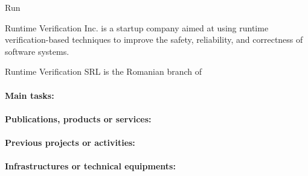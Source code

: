 \begin{sitedescription}{Run}



Runtime Verification Inc. is a startup company aimed at using runtime verification-based
techniques to improve the safety, reliability, and correctness of software systems.

Runtime Verification SRL is the Romanian branch of 

\paragraph{Main tasks:}



\begin{compactitem}
\item
\end{compactitem}

\paragraph{Publications, products or services:}


\begin{compactitem}
\item 
\end{compactitem}

\paragraph{Previous projects or activities:}


\begin{compactitem}
\item 
\end{compactitem}

\paragraph{Infrastructures or technical equipments:}


\end{sitedescription}
